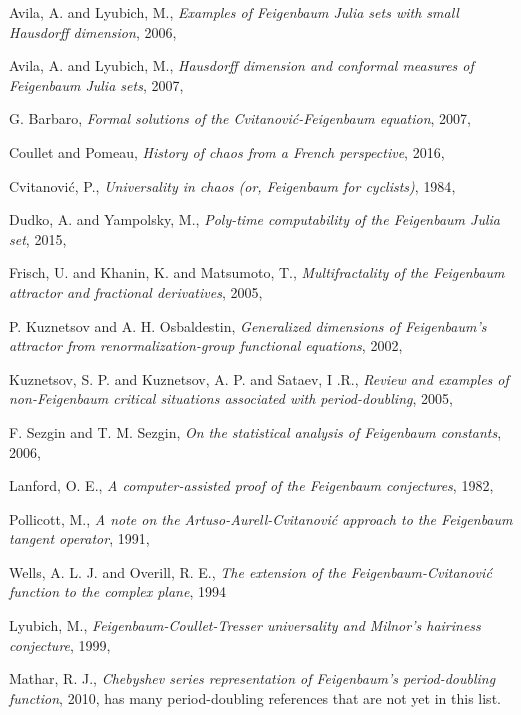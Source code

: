 \begin{description}
{Avila, A. and Lyubich, M.},
  {\em Examples of {Feigenbaum Julia} sets with small {Hausdorff} dimension},
{2006},

{Avila, A. and Lyubich, M.},
  {\em Hausdorff dimension and conformal measures of {Feigenbaum Julia} sets},
{2007},

{G. Barbaro},
{\em Formal solutions of the {Cvitanovi{\'c}-Feigenbaum} equation},
{2007},

{Coullet and Pomeau},
{\em History of chaos from a {French} perspective},
{2016},

{Cvitanovi{\'c}, P.},
{\em Universality in chaos (or, {Feigenbaum} for cyclists)},
{1984},

{Dudko, A. and Yampolsky, M.},
  {\em Poly-time computability of the {Feigenbaum Julia} set},
{2015},

{Frisch, U. and Khanin, K. and Matsumoto, T.},
{\em Multifractality of the {Feigenbaum} attractor and fractional derivatives},
{2005},

{P. Kuznetsov and A. H. Osbaldestin},
{\em Generalized dimensions of {Feigenbaum}'s attractor from renormalization-group functional equations},
{2002},

{Kuznetsov, S. P. and Kuznetsov, A. P. and Sataev, I .R.},
{\em Review and examples of non-{Feigenbaum} critical situations associated with period-doubling},
{2005},

{F. Sezgin and T. M. Sezgin},
{\em On the statistical analysis of {Feigenbaum} constants},
{2006},

{{Lanford}, O. E.},
{\em A computer-assisted proof of the {Feigenbaum} conjectures},
{1982},

{Pollicott, M.},
{\em A note on the {Artuso-Aurell-Cvitanovi{\'c}} approach to the {Feigenbaum} tangent operator},
{1991},

{Wells, A. L. J. and Overill, R. E.},
{\em The extension of the {Feigenbaum-Cvitanovi{\'c}} function to the complex plane},
{1994}

{Lyubich, M.},
{\em {Feigenbaum-Coullet-Tresser} universality and {Milnor}'s hairiness conjecture},
{1999},

{Mathar, R. J.},
{\em {Chebyshev} series representation of {Feigenbaum's} period-doubling function},
{2010}, has many period-doubling references that are not yet in this list.


\end{description}
